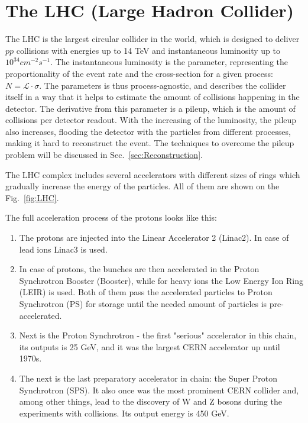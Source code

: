 \chapter{The LHC (Large Hadron Collider)}
\label{sec:LHC}

The LHC is the largest circular collider in the world, which is designed to deliver $pp$ collisions with energies up to 14 TeV and instantaneous luminosity up to $10^{34} cm^{-2}s^{-1}$. The instantaneous luminosity is the parameter, representing the proportionality of the event rate and the cross-section for a given process: $N = \mathcal{L} \cdot \sigma$. The parameters is thus process-agnostic, and describes the collider itself in a way that it helps to estimate the amount of collisions happening in the detector. The derivative from this parameter is a pileup, which is the amount of collisions per detector readout. With the increasing of the luminosity, the pileup also increases, flooding the detector with the particles from different processes, making it hard to reconstruct the event. The techniques to overcome the pileup problem will be discussed in Sec.~\ref{sec:Reconstruction}.

The LHC complex includes several accelerators with different sizes of rings which gradually increase the energy of the particles. All of them are shown on the Fig.~\ref{fig:LHC}.

\begin{figure}
\end{figure}

The full acceleration process of the protons looks like this:

\begin{enumerate}
\item The protons are injected into the Linear Accelerator 2 (Linac2). In case of lead ions Linac3 is used.
\item In case of protons, the bunches are then accelerated in the Proton Synchrotron Booster (Booster), while for heavy ions the Low Energy Ion Ring (LEIR) is used. Both of them pass the accelerated particles to Proton Synchrotron (PS) for storage until the needed amount of particles is pre-accelerated.
\item Next is the Proton Synchrotron - the first "serious" accelerator in this chain, its outputs is 25 GeV, and it was the largest CERN accelerator up until 1970s.
\item The next is the last preparatory accelerator in chain: the Super Proton Synchrotron (SPS). It also once was the most prominent CERN collider and, among other things, lead to the discovery of W and Z bosons during the experiments with  collisions. Its output energy is 450 GeV.
\end{enumerate}

